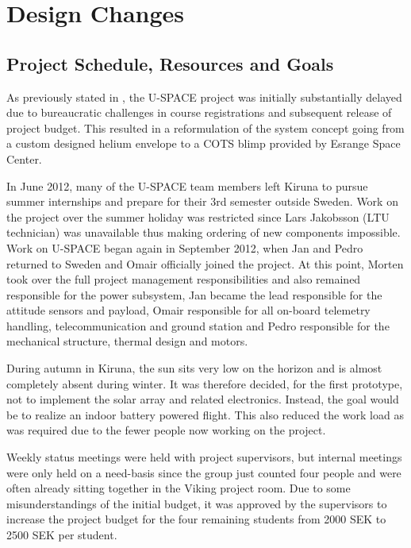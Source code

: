 \newpage
\chapter{Design Changes}
\label{chap:design_changes}
%
%
\section{Project Schedule, Resources and Goals}
\label{sec:project_changes}
%
As previously stated in \cite{CDR}, the U-SPACE project was initially substantially delayed due to bureaucratic challenges in course registrations and subsequent release of project budget. This resulted in a reformulation of the system concept going from a custom designed helium envelope to a \ac{COTS} blimp provided by Esrange Space Center.

In June 2012, many of the U-SPACE team members left Kiruna to pursue summer internships and prepare for their 3rd semester outside Sweden. Work on the project over the summer holiday was restricted since Lars Jakobsson (LTU technician) was unavailable thus making ordering of new components impossible. Work on U-SPACE began again in September 2012, when Jan and Pedro returned to Sweden and Omair officially joined the project. At this point, Morten took over the full project management responsibilities and also remained responsible for the power subsystem, Jan became the lead responsible for the attitude sensors and payload, Omair responsible for all on-board telemetry handling, telecommunication and ground station and Pedro responsible for the mechanical structure, thermal design and motors.

During autumn in Kiruna, the sun sits very low on the horizon and is almost completely absent during winter. It was therefore decided, for the first prototype, not to implement the solar array and related electronics. Instead, the goal would be to realize an indoor battery powered flight. This also reduced the work load as was required due to the fewer people now working on the project.

Weekly status meetings were held with project supervisors, but internal meetings were only held on a need-basis since the group just counted four people and were often already sitting together in the Viking project room. 
Due to some misunderstandings of the initial budget, it was approved by the supervisors to increase the project budget for the four remaining students from 2000 SEK to 2500 SEK per student. 


